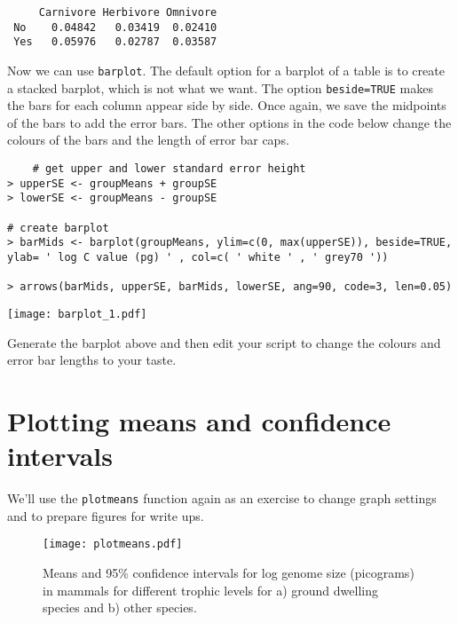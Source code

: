 \begin{lstlisting}
     Carnivore Herbivore Omnivore
 No    0.04842   0.03419  0.02410
 Yes   0.05976   0.02787  0.03587
\end{lstlisting}

Now we can use {\tt barplot}. The default option for a barplot of a 
table is to create a stacked barplot, which is not what we want. The 
option {\tt beside=TRUE} makes the bars for each column appear side by 
side. Once again, we save the midpoints of the bars to add the error 
bars. The other options in the code below change the colours of the 
bars and the length of error bar caps.
% 
\begin{lstlisting}
	# get upper and lower standard error height
> upperSE <- groupMeans + groupSE
> lowerSE <- groupMeans - groupSE

# create barplot
> barMids <- barplot(groupMeans, ylim=c(0, max(upperSE)), beside=TRUE, 
ylab= ' log C value (pg) ' , col=c( ' white ' , ' grey70 '))

> arrows(barMids, upperSE, barMids, lowerSE, ang=90, code=3, len=0.05)
\end{lstlisting}

\begin{center}
	\texttt{[image: barplot\_1.pdf]}
\end{center} 

\begin{compactitem}[$\quad\star$]
	\item Generate the barplot above and then edit your script to change 
	the colours and error bar lengths to your taste.
\end{compactitem}

\section{Plotting means and confidence intervals}

We'll use the {\tt plotmeans} function again as an exercise to change 
graph settings and to prepare figures for write ups. 

\begin{figure} \centering 
\texttt{[image: plotmeans.pdf]}

\caption{Means and 95\% confidence intervals for log genome size 
(picograms) in mammals for different trophic levels for a) ground 
dwelling species and b) other species.}

\label{fig:plotmeans}

\end{figure}

